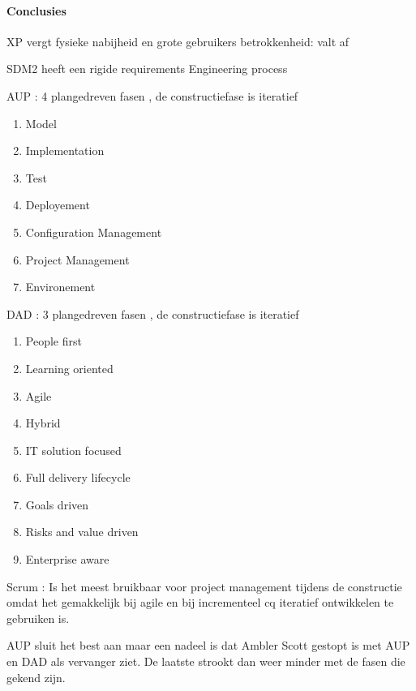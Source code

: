 	
\paragraph{Conclusies}
\begin{description}
\item XP vergt fysieke nabijheid en grote gebruikers betrokkenheid: valt af
\item SDM2 heeft een rigide requirements Engineering process
\item AUP : 4 plangedreven fasen , de constructiefase is iteratief
	\begin{enumerate}
		\item Model
		\item Implementation
		\item Test
		\item Deployement 
		\item Configuration Management
		\item Project Management
		\item Environement
	\end{enumerate}
\item DAD : 3 plangedreven fasen , de constructiefase is iteratief
	\begin{enumerate}
		\item People first
		\item Learning oriented
		\item Agile
		\item Hybrid 
		\item IT solution focused
		\item Full delivery lifecycle
		\item Goals driven
		\item Risks and value driven
		\item Enterprise aware
	\end{enumerate}
\item Scrum : Is het meest bruikbaar voor project management tijdens de constructie omdat
het gemakkelijk bij agile en bij incrementeel cq iteratief ontwikkelen te gebruiken is.
\end{description}

AUP sluit het best aan maar een nadeel is dat Ambler Scott gestopt is met AUP en DAD als vervanger ziet. De laatste strookt dan weer minder met de fasen die gekend zijn.



